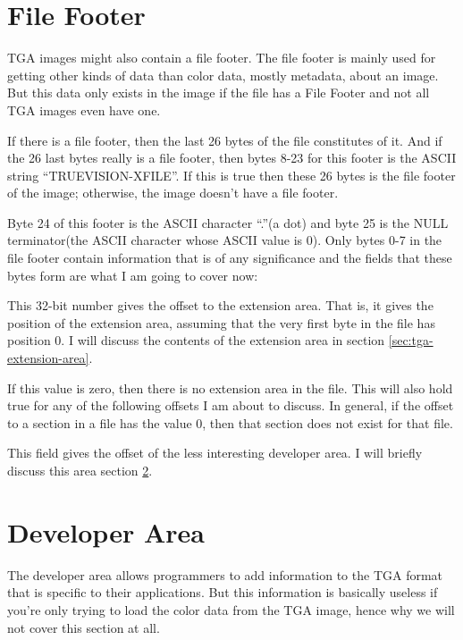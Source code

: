 \section{File Footer}

TGA images might also contain a file footer. The file footer is mainly
used for getting other kinds of data than color data, mostly metadata,
about an image. But this data only exists in the image if the file has
a File Footer and not all TGA images even have one.

If there is a file footer, then the last 26 bytes of the file
constitutes of it. And if the 26 last bytes really is a file footer,
then bytes 8-23 for this footer is the ASCII string
``TRUEVISION-XFILE''. If this is true then these 26 bytes is the file
footer of the image; otherwise, the image doesn't have a file footer.

Byte 24 of this footer is the ASCII character ``.''(a dot) and byte 25
is the NULL terminator(the ASCII character whose ASCII value is
0). Only bytes 0-7 in the file footer contain information that is of
any significance and the fields that these bytes form are what I am
going to cover now:


This 32-bit number gives the offset to the extension area. That is, it
gives the position of the extension area, assuming that the very first
byte in the file has position 0. I will discuss the contents of the
extension area in section \ref{sec:tga-extension-area}.

If this value is zero, then there is no extension area in the
file. This will also hold true for any of the following offsets I am
about to discuss. In general, if the offset to a section in a file has
the value $0$, then that section does not exist for that file.


This field gives the offset of the less interesting developer area. I
will briefly discuss this area section \ref{sec:developer-area}.

\section{Developer Area}
\label{sec:developer-area}

The developer area allows programmers to add information to the TGA
format that is specific to their applications. But this information is
basically useless if you're only trying to load the color data from
the TGA image, hence why we will not cover this section at all.

